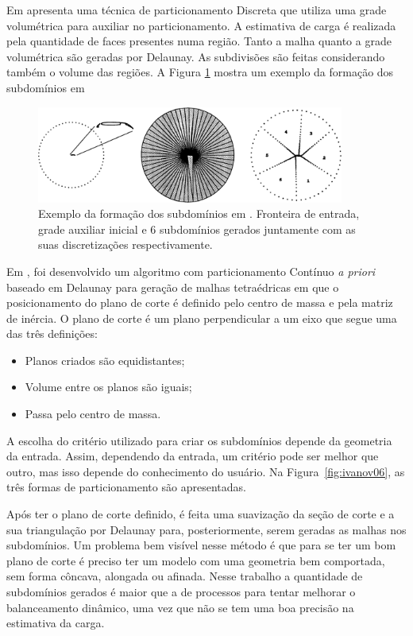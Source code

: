 Em \cite{bib:SAID99} apresenta uma técnica de particionamento Discreta que utiliza uma grade volumétrica para auxiliar no particionamento. A estimativa de carga é realizada pela quantidade de faces presentes numa região. Tanto a malha quanto a grade volumétrica são geradas por Delaunay. As subdivisões são feitas considerando também o volume das regiões. A Figura \ref{fig:said} mostra um exemplo da formação dos subdomínios em


 \begin{figure}[htbp]
     \centering
     \includegraphics[width=0.9\textwidth]{fig/said.png}
     \caption{Exemplo da formação dos subdomínios em \cite{bib:SAID99}. Fronteira de entrada, grade auxiliar inicial e 6 subdomínios gerados juntamente com as suas discretizações respectivamente.}
     \label{fig:said}
 \end{figure} 


Em \cite{bib:Ivanov06}, foi desenvolvido um algoritmo com particionamento Contínuo \textit{a priori} baseado em Delaunay para geração de malhas tetraédricas em que o posicionamento do plano de corte é definido pelo centro de massa e pela matriz de inércia. O plano de corte é um plano perpendicular a um eixo que segue uma das três definições:

\begin{itemize}
  \item Planos criados são equidistantes;

  \item Volume entre os planos são iguais;

  \item Passa pelo centro de massa.
\end{itemize}

A escolha do critério utilizado para criar os subdomínios depende da geometria da entrada. Assim, dependendo da entrada, um critério pode ser melhor que outro, mas isso depende do conhecimento do usuário. Na Figura~\ref{fig:ivanov06}, as três formas de particionamento são apresentadas.

Após ter o plano de corte definido, é feita uma suavização da seção de corte e a sua triangulação por Delaunay para, posteriormente, serem geradas as malhas nos subdomínios. Um problema bem visível nesse método é que para se ter um bom plano de corte é preciso ter um modelo com uma geometria bem comportada, sem forma côncava, alongada ou afinada. Nesse trabalho a quantidade de subdomínios gerados é maior que a de processos para tentar melhorar o balanceamento dinâmico, uma vez que não se tem uma boa precisão na estimativa da carga.


